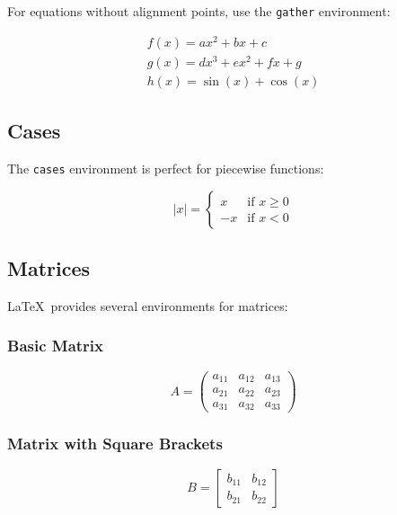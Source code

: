 \documentclass[11pt,a4paper]{article}
\begin{document}
For equations without alignment points, use the \verb|gather| environment:

\begin{gather}
    f(x) = ax^2 + bx + c \\
    g(x) = dx^3 + ex^2 + fx + g \\
    h(x) = \sin(x) + \cos(x)
\end{gather}

\subsection{Cases}

The \verb|cases| environment is perfect for piecewise functions:

\begin{equation}
    |x| = 
    \begin{cases}
        x & \text{if } x \geq 0 \\
        -x & \text{if } x < 0
    \end{cases}
\end{equation}

\subsection{Matrices}

\LaTeX\ provides several environments for matrices:

\subsubsection{Basic Matrix}
\begin{equation}
    A = 
    \begin{pmatrix}
        a_{11} & a_{12} & a_{13} \\
        a_{21} & a_{22} & a_{23} \\
        a_{31} & a_{32} & a_{33}
    \end{pmatrix}
\end{equation}

\subsubsection{Matrix with Square Brackets}
\begin{equation}
    B = 
    \begin{bmatrix}
        b_{11} & b_{12} \\
        b_{21} & b_{22}
    \end{bmatrix}
\end{equation}
\end{document}
